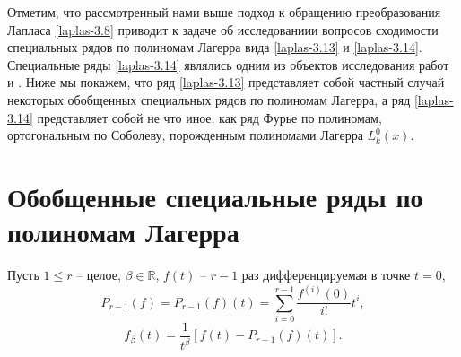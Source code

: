  Отметим, что рассмотренный нами выше подход к обращению преобразования  Лапласа \eqref{laplas-3.8} приводит к задаче об исследованиии вопросов сходимости  специальных рядов по полиномам Лагерра вида \eqref{laplas-3.13} и \eqref{laplas-3.14}. Специальные ряды \eqref{laplas-3.14} являлись одним из объектов исследования работ  \cite{laplas-Shar11} и \cite{sobleg-SHII}. Ниже мы покажем, что ряд \eqref{laplas-3.13} представляет собой частный случай некоторых обобщенных специальных рядов по полиномам Лагерра, а ряд \eqref{laplas-3.14} представляет собой не что иное, как ряд Фурье по полиномам, ортогональным по Соболеву, порожденным полиномами Лагерра $L_k^0(x)$.














\section{Обобщенные специальные ряды по полиномам Лагерра}

Пусть $1\le r$ -- целое, $\beta\in \mathbb{R}$, $f(t)$ -- $r-1$ раз дифференцируемая в точке $t=0$,
\begin{equation}\label{laplas-4.1}
  P_{r-1}(f)=P_{r-1}(f)(t)=\sum\limits_{i=0}^{r-1}\frac{f^{(i)}(0)}{i!}t^i,
\end{equation}
\begin{equation}\label{laplas-4.2}
  f_\beta(t)=\frac1{t^\beta}[f(t)-P_{r-1}(f)(t)].
\end{equation}

